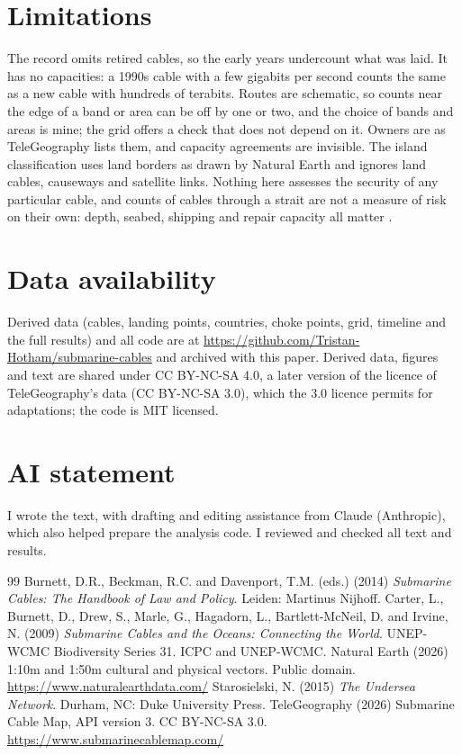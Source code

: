 \documentclass[11pt,a4paper]{article}
\begin{document}
\section{Limitations}
The record omits retired cables, so the early years undercount what was laid. It has no capacities: a 1990s cable with a few gigabits per second counts the same as a new cable with hundreds of terabits. Routes are schematic, so counts near the edge of a band or area can be off by one or two, and the choice of bands and areas is mine; the grid offers a check that does not depend on it. Owners are as TeleGeography lists them, and capacity agreements are invisible. The island classification uses land borders as drawn by Natural Earth and ignores land cables, causeways and satellite links. Nothing here assesses the security of any particular cable, and counts of cables through a strait are not a measure of risk on their own: depth, seabed, shipping and repair capacity all matter \citep{carter2009}.

\section*{Data availability}
Derived data (cables, landing points, countries, choke points, grid, timeline and the full results) and all code are at \url{https://github.com/Tristan-Hotham/submarine-cables} and archived with this paper. Derived data, figures and text are shared under CC BY-NC-SA 4.0, a later version of the licence of TeleGeography's data (CC BY-NC-SA 3.0), which the 3.0 licence permits for adaptations; the code is MIT licensed.

\section*{AI statement}
I wrote the text, with drafting and editing assistance from Claude (Anthropic), which also helped prepare the analysis code. I reviewed and checked all text and results.

\begin{thebibliography}{99}
 Burnett, D.R., Beckman, R.C. and Davenport, T.M. (eds.) (2014) \emph{Submarine Cables: The Handbook of Law and Policy}. Leiden: Martinus Nijhoff.
 Carter, L., Burnett, D., Drew, S., Marle, G., Hagadorn, L., Bartlett-McNeil, D. and Irvine, N. (2009) \emph{Submarine Cables and the Oceans: Connecting the World}. UNEP-WCMC Biodiversity Series 31. ICPC and UNEP-WCMC.
 Natural Earth (2026) 1:10m and 1:50m cultural and physical vectors. Public domain. \url{https://www.naturalearthdata.com/}
 Starosielski, N. (2015) \emph{The Undersea Network}. Durham, NC: Duke University Press.
 TeleGeography (2026) Submarine Cable Map, API version 3. CC BY-NC-SA 3.0. \url{https://www.submarinecablemap.com/}
\end{thebibliography}
\end{document}
